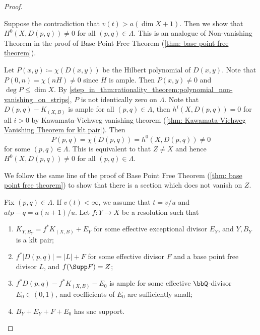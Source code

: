 \begin{proof}
        \begin{step}\label{step_in_thm:rationality_theorem:non-vanishing_on_strips}
            Suppose the contradiction that \(v(t) > a(\dim X + 1)\).
            Then we show that \(H^0(X,D(p,q)) \neq 0\) for all \((p,q) \in \Lambda\).
            This is an analogue of Non-vanishing Theorem in the proof of Base Point Free Theorem (\cref{thm: base point free theorem}).
        \end{step}
        Let \(P(x,y)\coloneqq \chi(D(x,y))\) be the Hilbert polynomial of \(D(x,y)\).
        Note that \(P(0,n) = \chi(nH) \neq 0\) since \(H\) is ample.
        Then \(P(x,y) \neq 0\) and \(\deg P \leq \dim X\).
        By \cref{step_in_thm:rationality_theorem:polynomial_non-vanishing_on_strips}, \(P\) is not identically zero on \(\Lambda\).
        Note that \(D(p,q) - K_{(X,B)}\) is ample for all \((p,q) \in \Lambda\), then \(h^i(X,D(p,q)) = 0\) for all \(i > 0\) by Kawamata-Viehweg vanishing theorem (\cref{thm: Kawamata-Viehweg Vanishing Theorem for klt pair}).
        Then
        \[ P(p,q) = \chi(D(p,q)) = h^0(X,D(p,q)) \neq 0 \]
        for some \((p,q) \in \Lambda\).
        This is equivalent to that \(Z \neq X\) and hence \(H^0(X,D(p,q)) \neq 0\) for all \((p,q) \in \Lambda\).


        \begin{step}
            We follow the same line of the proof of Base Point Free Theorem (\cref{thm: base point free theorem}) to show that there is a section which does not vanish on \(Z\).
        \end{step}
        Fix \((p,q) \in \Lambda\).
        If \(v(t) < \infty\), we assume that \(t=v/u\) and \(atp-q = a(n+1)/u\).
        Let \(f:Y \to X\) be a resolution such that
        \begin{enumerate}
            \item \(K_{Y,B_Y} = f^*K_{(X,B)} + E_Y\) for some effective exceptional divisor \(E_Y\), and \(Y,B_Y\) is a klt pair;
            \item \(f^*|D(p,q)| = |L| + F\) for some effective divisor \(F\) and a base point free divisor \(L\), and \(f(\Supp F) = Z\);
            \item \(f^*D(p,q) - f^*K_{(X,B)} - E_0\) is ample for some effective \(\bbQ\)-divisor \(E_0 \in (0,1)\), and coefficients of \(E_0\) are sufficiently small;
            \item \(B_Y + E_Y + F + E_0\) has snc support.
        \end{enumerate}


\end{proof}
